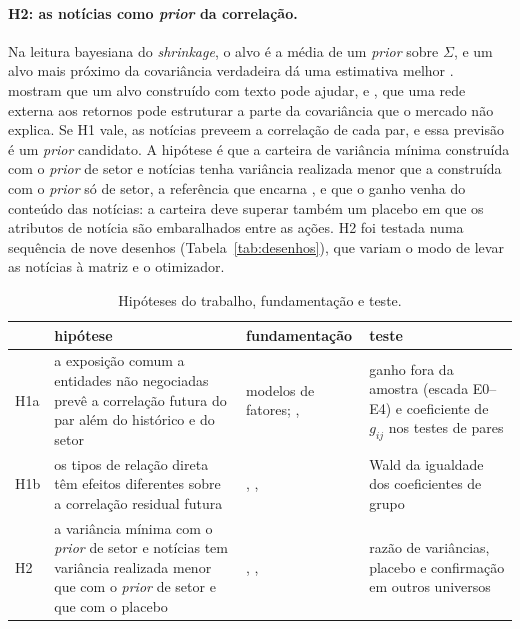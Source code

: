 \paragraph{H2: as notícias como \emph{prior} da correlação.} Na leitura bayesiana do \emph{shrinkage}, o
alvo é a média de um \emph{prior} sobre $\Sigma$, e um alvo mais próximo da covariância verdadeira dá uma
estimativa melhor \citep{ledoit2004honey}. \citet{becquin2023} mostram que um alvo construído com texto
pode ajudar, e \citet{lu2023}, que uma rede externa aos retornos pode estruturar a parte da covariância que
o mercado não explica. Se H1 vale, as notícias preveem a correlação de cada par, e essa previsão é um
\emph{prior} candidato. A hipótese é que a carteira de variância mínima construída com o \emph{prior} de
setor e notícias tenha variância realizada menor que a construída com o \emph{prior} só de setor, a
referência que encarna \citet{elton1973}, e que o ganho venha do conteúdo das notícias: a carteira deve
superar também um placebo em que os atributos de notícia são embaralhados entre as ações. H2 foi testada
numa sequência de nove desenhos (Tabela~\ref{tab:desenhos}), que variam o modo de levar as notícias à
matriz e o otimizador.

\begin{table}[htbp]
\centering
\small
\caption{Hipóteses do trabalho, fundamentação e teste.}
\label{tab:hipoteses}
\begin{tabularx}{\textwidth}{>{\raggedright\arraybackslash}p{0.9cm}>{\raggedright\arraybackslash}X>{\raggedright\arraybackslash}p{3.6cm}>{\raggedright\arraybackslash}p{3.6cm}}
\toprule
& hipótese & fundamentação & teste \\
\midrule
H1a & a exposição comum a entidades não negociadas prevê a correlação futura do par além do histórico e do setor & modelos de fatores; \citet{elton1973}, \citet{chan1999} & ganho fora da amostra (escada E0--E4) e coeficiente de $g_{ij}$ nos testes de pares \\
H1b & os tipos de relação direta têm efeitos diferentes sobre a correlação residual futura & \citet{cohen2008}, \citet{menzly2010}, \citet{hoberg2016} & Wald da igualdade dos coeficientes de grupo \\
H2 & a variância mínima com o \emph{prior} de setor e notícias tem variância realizada menor que com o \emph{prior} de setor e que com o placebo & \citet{ledoit2004honey}, \citet{becquin2023}, \citet{lu2023} & razão de variâncias, placebo e confirmação em outros universos \\
\bottomrule
\end{tabularx}
\end{table}

